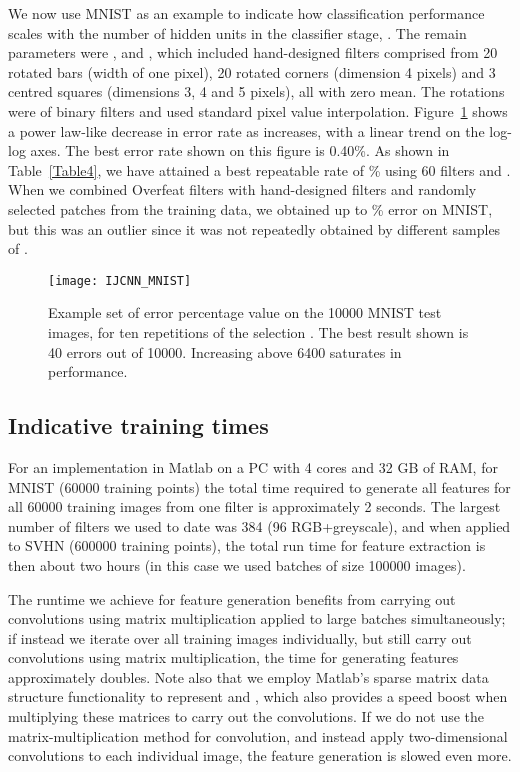 \documentclass[conference]{IEEEtran}
\begin{document}
We now use MNIST as an example to indicate how classification performance scales with the number of hidden units in the classifier stage, . The remain parameters were ,  and , which included hand-designed filters comprised from 20 rotated bars (width of one pixel), 20 rotated corners (dimension 4 pixels) and 3 centred squares (dimensions 3, 4 and 5 pixels), all with  zero mean. The rotations were of binary filters and used standard pixel value interpolation. Figure~\ref{fig_MNIST} shows a power law-like decrease in error rate as  increases, with a linear trend on the log-log axes. The best error rate shown on this figure is 0.40\%. As shown in Table~\ref{Table4}, we have attained a best repeatable rate of \% using 60 filters and . When we combined Overfeat filters with hand-designed filters and randomly selected patches from the training data, we obtained up to \% error on MNIST, but this was an outlier since it was not repeatedly obtained by different samples of .


\begin{figure}[!ht]
\centering
\texttt{[image: IJCNN\_MNIST]}
 \caption{Example set of error percentage value on the 10000 MNIST test images, for ten repetitions of the selection . The best result shown is 40 errors out of 10000. Increasing  above 6400 saturates in performance.}
\label{fig_MNIST}
\end{figure}

\subsection{Indicative training times}

For an implementation in Matlab on a PC with 4 cores and 32 GB of RAM, for MNIST (60000 training points) the total time required to generate all features for all 60000 training images from one filter is approximately 2 seconds. The largest number of filters we used to date was 384 (96 RGB+greyscale), and when applied to SVHN (600000 training points), the total run time for feature extraction is then about two hours (in this case we used batches of size 100000 images). 

The runtime we achieve for feature generation benefits from carrying out convolutions using matrix multiplication applied to large batches simultaneously; if instead we iterate over all training images individually, but still carry out convolutions using matrix multiplication, the time for generating features approximately doubles.   Note also that we employ Matlab's sparse matrix data structure functionality to represent  and , which also provides a speed boost when multiplying these matrices to carry out the convolutions.  If we do not use the matrix-multiplication method for convolution, and instead apply two-dimensional convolutions to each individual image, the feature generation is slowed even more.
\end{document}
